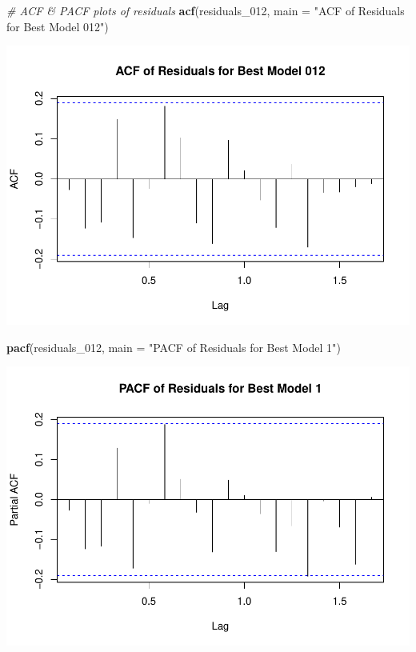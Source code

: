 \documentclass[
]{book}
\newenvironment{Shaded}{\begin{snugshade}}{\end{snugshade}}
\newcommand{\AttributeTok}[1]{\textcolor[rgb]{0.13,0.29,0.53}{#1}}
\newcommand{\CommentTok}[1]{\textcolor[rgb]{0.56,0.35,0.01}{\textit{#1}}}
\newcommand{\FunctionTok}[1]{\textcolor[rgb]{0.13,0.29,0.53}{\textbf{#1}}}
\newcommand{\NormalTok}[1]{#1}
\newcommand{\StringTok}[1]{\textcolor[rgb]{0.31,0.60,0.02}{#1}}
\begin{document}
\begin{Shaded}
\begin{Highlighting}[]
\CommentTok{\# ACF \& PACF plots of residuals}
\FunctionTok{acf}\NormalTok{(residuals\_012, }\AttributeTok{main =} \StringTok{"ACF of Residuals for Best Model 012"}\NormalTok{)}
\end{Highlighting}
\end{Shaded}

\includegraphics{bookdown-demo_files/figure-latex/unnamed-chunk-50-1.pdf}

\begin{Shaded}
\begin{Highlighting}[]
\FunctionTok{pacf}\NormalTok{(residuals\_012, }\AttributeTok{main =} \StringTok{"PACF of Residuals for Best Model 1"}\NormalTok{)}
\end{Highlighting}
\end{Shaded}

\includegraphics{bookdown-demo_files/figure-latex/unnamed-chunk-50-2.pdf}
\end{document}
